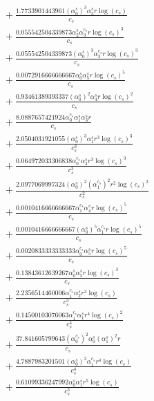 \documentclass[10pt]{article}
\begin{document}
\begin{align*}
&{}  + \frac{1.7733901443961 \left(\alpha_{0}^s\right)^{3} \alpha_{3}^s r \log{\left(c_{s} \right)}}{c_{s}} \\
&{}  + \frac{0.055542504339873 \alpha_{2}^s \alpha_{3}^{c_s} r \log{\left(c_{s} \right)}^{3}}{c_{s}} \\
&{}  + \frac{0.055542504339873 \left(\alpha_{0}^s\right)^{3} \alpha_{3}^{c_s} r \log{\left(c_{s} \right)}^{3}}{c_{s}} \\
&{}  + \frac{0.0072916666666667 \alpha_{0}^s \alpha_{5}^s r \log{\left(c_{s} \right)}^{5}}{c_{s}} \\
&{}  + \frac{0.93461389393337 \left(\alpha_{0}^s\right)^{2} \alpha_{4}^s r \log{\left(c_{s} \right)}^{2}}{c_{s}} \\
&{}  + \frac{8.0887657421924 \alpha_{0}^{c_s} \alpha_{1}^s \alpha_{3}^s r}{c_{s}} \\
&{}  + \frac{2.0504031921055 \left(\alpha_{0}^s\right)^{3} \alpha_{1}^s r^{3} \log{\left(c_{s} \right)}^{3}}{c_{s}^{3}} \\
&{}  + \frac{0.064972033306838 \alpha_{0}^{c_s} \alpha_{3}^s r^{3} \log{\left(c_{s} \right)}^{3}}{c_{s}^{3}} \\
&{}  + \frac{2.0977069997324 \left(\alpha_{0}^s\right)^{2} \left(\alpha_{1}^{c_s}\right)^{2} r^{2} \log{\left(c_{s} \right)}^{2}}{c_{s}^{2}} \\
&{}  + \frac{0.0010416666666667 \alpha_{1}^{c_s} \alpha_{4}^s r \log{\left(c_{s} \right)}^{5}}{c_{s}} \\
&{}  + \frac{0.0010416666666667 \left(\alpha_{0}^s\right)^{5} \alpha_{1}^{c_s} r \log{\left(c_{s} \right)}^{5}}{c_{s}} \\
&{}  + \frac{0.0020833333333333 \alpha_{0}^{c_s} \alpha_{5}^s r \log{\left(c_{s} \right)}^{5}}{c_{s}} \\
&{}  + \frac{0.13843612639267 \alpha_{0}^s \alpha_{5}^s r \log{\left(c_{s} \right)}^{3}}{c_{s}} \\
&{}  + \frac{2.2356514460006 \alpha_{1}^{c_s} \alpha_{2}^s r^{3} \log{\left(c_{s} \right)}}{c_{s}^{3}} \\
&{}  + \frac{0.14500103076063 \alpha_{1}^{c_s} \alpha_{1}^s r^{4} \log{\left(c_{s} \right)}^{2}}{c_{s}^{4}} \\
&{}  + \frac{37.841605799643 \left(\alpha_{0}^{c_s}\right)^{2} \alpha_{0}^s \left(\alpha_{1}^s\right)^{2} r}{c_{s}} \\
&{}  + \frac{4.7887983201501 \left(\alpha_{0}^s\right)^{2} \alpha_{1}^{c_s} r^{4} \log{\left(c_{s} \right)}}{c_{s}^{4}} \\
&{}  + \frac{0.61099336247992 \alpha_{0}^s \alpha_{1}^s r^{5} \log{\left(c_{s} \right)}}{c_{s}^{5}} \\

\end{align*}
\end{document}
